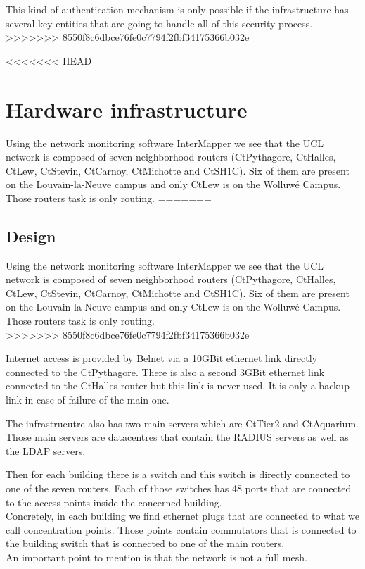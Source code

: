 This kind of authentication mechanism is only possible if the infrastructure has several key entities that are going to handle all of this security process.
>>>>>>> 8550f8c6dbce76fe0c7794f2fbf34175366b032e




<<<<<<< HEAD
\section{Hardware infrastructure}
Using the network monitoring software InterMapper\cite{intermapper} we see that the UCL network is composed of seven neighborhood routers (CtPythagore, CtHalles, CtLew, CtStevin, CtCarnoy, CtMichotte and CtSH1C). Six of them are present on the Louvain-la-Neuve campus and only CtLew is on the Wolluwé Campus. Those routers task is only routing.
=======
\subsection{Design}
Using the network monitoring software InterMapper\cite{intermapper} we see that the UCL network is composed of seven neighborhood routers (CtPythagore, CtHalles, CtLew, CtStevin, CtCarnoy, CtMichotte and CtSH1C). Six of them are present on the Louvain-la-Neuve campus and only CtLew is on the Wolluwé Campus. Those routers task is only routing.\\
>>>>>>> 8550f8c6dbce76fe0c7794f2fbf34175366b032e

Internet access is provided by Belnet via a 10GBit ethernet link directly connected to the CtPythagore. There is also a second 3GBit ethernet link connected to the CtHalles router but this link is never used. It is only a backup link in case of failure of the main one.

The infrastrucutre also has two main servers which are CtTier2 and CtAquarium. Those main servers are datacentres that contain the RADIUS servers as well as the LDAP servers.

Then for each building there is a switch and this switch is directly connected to one of the seven routers. Each of those switches has 48 ports that are connected to the access points inside the concerned building.\\
Concretely, in each building we find ethernet plugs that are connected to what we call concentration points. Those points contain commutators that is connected to the building switch that is connected to one of the main routers.\\
An important point to mention is that the network is not a full mesh.

